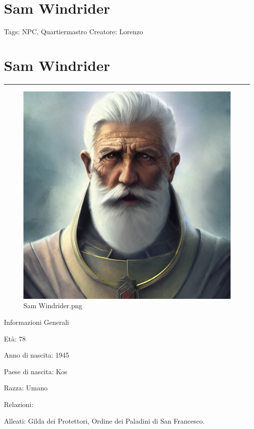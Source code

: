 \section{Sam Windrider}\label{sam-windrider}

Tags: NPC, Quartiermastro Creatore: Lorenzo

\section{Sam Windrider}\label{sam-windrider-1}

\begin{center}\rule{0.5\linewidth}{0.5pt}\end{center}

\begin{figure}
\centering
\includegraphics{Sam_Windrider.png}
\caption{Sam Windrider.png}
\end{figure}

Informazioni Generali

Età: 78

Anno di nascita: 1945

Paese di nascita: Kos

Razza: Umano

Relazioni:

Alleati: Gilda dei Protettori, Ordine dei Paladini di San Francesco.


